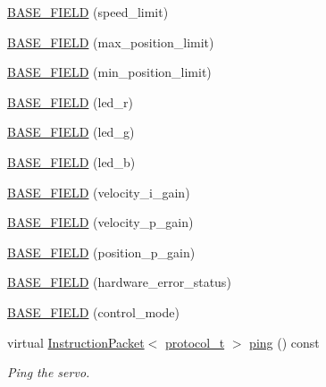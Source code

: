 \begin{DoxyCompactItemize}
\item 
\hyperlink{classdynamixel_1_1servos_1_1_base_servo_a28a3e801191c864226610c99163b906a}{B\+A\+S\+E\+\_\+\+F\+I\+E\+L\+D} (speed\+\_\+limit)
\item 
\hyperlink{classdynamixel_1_1servos_1_1_base_servo_a8f269d5d442445a4744e6404b5cb2c58}{B\+A\+S\+E\+\_\+\+F\+I\+E\+L\+D} (max\+\_\+position\+\_\+limit)
\item 
\hyperlink{classdynamixel_1_1servos_1_1_base_servo_aaefe353baec0ad45d9310e985da01fd7}{B\+A\+S\+E\+\_\+\+F\+I\+E\+L\+D} (min\+\_\+position\+\_\+limit)
\item 
\hyperlink{classdynamixel_1_1servos_1_1_base_servo_a2675879e1916600b4251a8798dda7792}{B\+A\+S\+E\+\_\+\+F\+I\+E\+L\+D} (led\+\_\+r)
\item 
\hyperlink{classdynamixel_1_1servos_1_1_base_servo_ad004618d6add77d2a3599dfe0a9b8be2}{B\+A\+S\+E\+\_\+\+F\+I\+E\+L\+D} (led\+\_\+g)
\item 
\hyperlink{classdynamixel_1_1servos_1_1_base_servo_afbf232f99d9b318714936dd12fd71474}{B\+A\+S\+E\+\_\+\+F\+I\+E\+L\+D} (led\+\_\+b)
\item 
\hyperlink{classdynamixel_1_1servos_1_1_base_servo_a87e0bff5c474582d9bbd1ffe45f91da5}{B\+A\+S\+E\+\_\+\+F\+I\+E\+L\+D} (velocity\+\_\+i\+\_\+gain)
\item 
\hyperlink{classdynamixel_1_1servos_1_1_base_servo_a3ecd90f9f9c23eefeb298508ce7d26d9}{B\+A\+S\+E\+\_\+\+F\+I\+E\+L\+D} (velocity\+\_\+p\+\_\+gain)
\item 
\hyperlink{classdynamixel_1_1servos_1_1_base_servo_a0aa14b2dc61dafdb0e1e238a37e57083}{B\+A\+S\+E\+\_\+\+F\+I\+E\+L\+D} (position\+\_\+p\+\_\+gain)
\item 
\hyperlink{classdynamixel_1_1servos_1_1_base_servo_a8a5b6f0cccde10173a942d1da92a4064}{B\+A\+S\+E\+\_\+\+F\+I\+E\+L\+D} (hardware\+\_\+error\+\_\+status)
\item 
\hyperlink{classdynamixel_1_1servos_1_1_base_servo_ad9fe76845a8b139921b35b7d346480e1}{B\+A\+S\+E\+\_\+\+F\+I\+E\+L\+D} (control\+\_\+mode)
\item 
virtual \hyperlink{classdynamixel_1_1_instruction_packet}{Instruction\+Packet}$<$ \hyperlink{classdynamixel_1_1servos_1_1_base_servo_ac484c11279ee2576a9a3bb8c940e0baf}{protocol\+\_\+t} $>$ \hyperlink{classdynamixel_1_1servos_1_1_base_servo_adae0a44afbebfb03343d325648387301}{ping} () const 
\begin{DoxyCompactList}\small\item\em Ping the servo. \end{DoxyCompactList}\item 

\end{DoxyCompactItemize}
